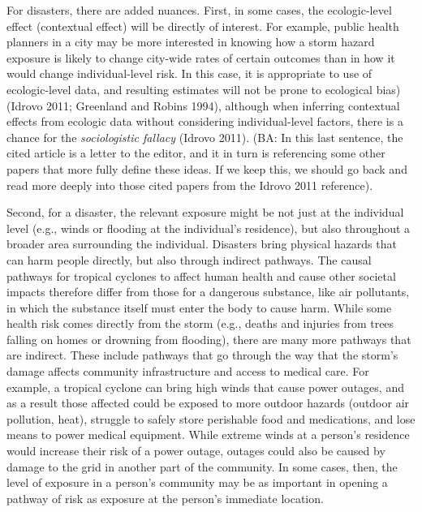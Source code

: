 \documentclass[]{article}
\begin{document}
For disasters, there are added nuances. First, in some cases, the
ecologic-level effect (contextual effect) will be directly of interest.
For example, public health planners in a city may be more interested in
knowing how a storm hazard exposure is likely to change city-wide rates
of certain outcomes than in how it would change individual-level risk.
In this case, it is appropriate to use of ecologic-level data, and
resulting estimates will not be prone to ecological bias) (Idrovo 2011;
Greenland and Robins 1994), although when inferring contextual effects
from ecologic data without considering individual-level factors, there
is a chance for the \emph{sociologistic fallacy} (Idrovo 2011). (BA: In
this last sentence, the cited article is a letter to the editor, and it
in turn is referencing some other papers that more fully define these
ideas. If we keep this, we should go back and read more deeply into
those cited papers from the Idrovo 2011 reference).

Second, for a disaster, the relevant exposure might be not just at the
individual level (e.g., winds or flooding at the individual's
residence), but also throughout a broader area surrounding the
individual. Disasters bring physical hazards that can harm people
directly, but also through indirect pathways. The causal pathways for
tropical cyclones to affect human health and cause other societal
impacts therefore differ from those for a dangerous substance, like air
pollutants, in which the substance itself must enter the body to cause
harm. While some health risk comes directly from the storm (e.g., deaths
and injuries from trees falling on homes or drowning from flooding),
there are many more pathways that are indirect. These include pathways
that go through the way that the storm's damage affects community
infrastructure and access to medical care. For example, a tropical
cyclone can bring high winds that cause power outages, and as a result
those affected could be exposed to more outdoor hazards (outdoor air
pollution, heat), struggle to safely store perishable food and
medications, and lose means to power medical equipment. While extreme
winds at a person's residence would increase their risk of a power
outage, outages could also be caused by damage to the grid in another
part of the community. In some cases, then, the level of exposure in a
person's community may be as important in opening a pathway of risk as
exposure at the person's immediate location.
\end{document}
